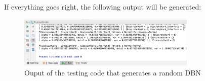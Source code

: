 \documentclass[10pt,a4paper]{article}
\begin{document}
\noindent If everything goes right, the following output will be
generated:\newline


\begin{figure}[h!]
	\centering
	\includegraphics[width=8.5cm]{img/use_amidst09.png}
	\caption{Ouput of the testing code that generates a random  DBN}
	\label{fig:remoteDeps_output}	
\end{figure}
\end{document}
